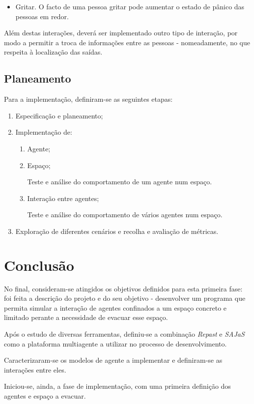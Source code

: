 \documentclass[12pt]{article}
\begin{document}
\begin{titlepage}
\begin{itemize}
\item Gritar.
	O facto de uma pessoa gritar pode aumentar o estado de pânico das pessoas em redor.
\end{itemize}

Além destas interações, deverá ser implementado outro tipo de interação, por modo a permitir a troca de informações entre as pessoas - nomeadamente, no que respeita à localização das saídas.

\subsection{Planeamento}
Para a implementação, definiram-se as seguintes etapas:
\begin{enumerate}
	\item Especificação e planeamento;
	\item Implementação de:
	 \begin{enumerate} 
	 	\item Agente;
	 	\item Espaço;
	 	
	 	Teste e análise do comportamento de um agente num espaço.
		\item Interação entre agentes;
		
		Teste e análise do comportamento de vários agentes num espaço. 
	\end{enumerate}
	\item Exploração de diferentes cenários e recolha e avaliação de métricas.
\end{enumerate}


\section{Conclusão}

No final, consideram-se atingidos os objetivos definidos para esta primeira fase: foi feita a descrição do projeto e do seu objetivo - desenvolver um programa que permita simular a interação de agentes confinados a um espaço concreto e limitado perante a necessidade de evacuar esse espaço.

Após o estudo de diversas ferramentas, definiu-se a combinação \textit{Repast} e \textit{SAJaS} como a plataforma multiagente a utilizar no processo de  desenvolvimento.

Caracterizaram-se os modelos de agente a implementar e definiram-se as interações entre eles.

Iniciou-se, ainda, a fase de implementação, com uma primeira definição dos agentes e espaço a evacuar.




\end{titlepage}
\end{document}
